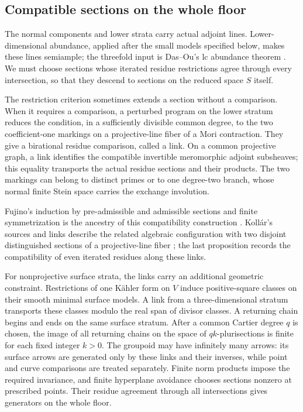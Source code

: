 \subsection*{Compatible sections on the whole floor}

The normal components and lower strata carry actual adjoint lines.
Lower-dimensional abundance, applied after the small models specified
below, makes these lines semiample; the threefold input is Das--Ou's
lc abundance theorem \cite[Corollary~1.3]{DasOu2025}.  We must choose
sections whose iterated residue restrictions agree through every
intersection, so that they descend to sections on the reduced space
\(S\) itself.

The restriction criterion sometimes extends a section without a
comparison.  When it requires a comparison, a perturbed program on the
lower stratum reduces the condition, in a sufficiently divisible common
degree, to the two coefficient-one markings on a projective-line fiber
of a Mori contraction.  They give a birational residue comparison,
called a link.  On a common projective graph, a link identifies the
compatible invertible meromorphic adjoint subsheaves; this equality
transports the actual residue sections and their products.  The two
markings can belong to distinct primes or to one degree-two branch, whose
normal finite Stein space carries the exchange involution.

Fujino's induction by pre-admissible and admissible sections and finite
symmetrization is the ancestry of this compatibility construction
\cite[Sections~2--4]{Fujino2000}.  Koll\'ar's sources and links describe
the related algebraic configuration with two disjoint distinguished
sections of a projective-line fiber
\cite[Definition~9, Theorem~10, and Proposition~14]{Kollar2013Sources};
the last proposition records the compatibility of even iterated residues
along these links.

For nonprojective surface strata, the links carry an additional geometric
constraint.  Restrictions of one K\"ahler form on \(V\) induce
positive-square classes on their smooth minimal surface models.  A link
from a three-dimensional stratum transports these classes modulo the
real span of divisor classes.  A returning chain begins and ends on the
same surface stratum.  After a common Cartier degree \(q\) is chosen,
the image of all returning chains on the space of \(qk\)-plurisections
is finite for each fixed integer \(k>0\).  The groupoid may have
infinitely many arrows: its surface arrows are generated only by these
links and their inverses, while point and curve comparisons are treated
separately.  Finite norm products impose the required invariance, and
finite hyperplane avoidance chooses sections nonzero at prescribed
points.  Their residue agreement through all intersections gives
generators on the whole floor.

